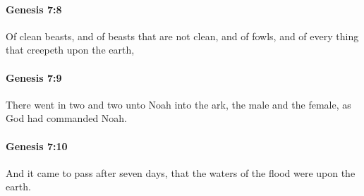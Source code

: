 		\paragraph{Genesis 7:8} %
			\label{GENESIS-7-8}

			Of clean beasts, and of beasts that are not clean, and of fowls, and of every thing that creepeth upon the earth,


		\paragraph{Genesis 7:9} %
			\label{GENESIS-7-9}

			There went in two and two unto Noah into the ark, the male and the female, as God had commanded Noah.


		\paragraph{Genesis 7:10} %
			\label{GENESIS-7-10}

			And it came to pass after seven days, that the waters of the flood were upon the earth.


